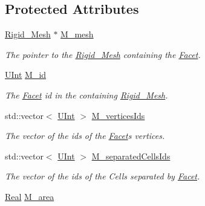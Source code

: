 \subsection*{Protected Attributes}
\begin{DoxyCompactItemize}
\item 
\hyperlink{classFVCode3D_1_1Rigid__Mesh}{Rigid\+\_\+\+Mesh} $\ast$ \hyperlink{classFVCode3D_1_1Rigid__Mesh_1_1Facet_af220d353a3aad7de9b1fa293ac594893}{M\+\_\+mesh}
\begin{DoxyCompactList}\small\item\em The pointer to the \hyperlink{classFVCode3D_1_1Rigid__Mesh}{Rigid\+\_\+\+Mesh} containing the \hyperlink{classFVCode3D_1_1Rigid__Mesh_1_1Facet}{Facet}. \end{DoxyCompactList}\item 
\hyperlink{namespaceFVCode3D_a4bf7e328c75d0fd504050d040ebe9eda}{U\+Int} \hyperlink{classFVCode3D_1_1Rigid__Mesh_1_1Facet_a00456afaee76a9be2a9beb4180a76d15}{M\+\_\+id}
\begin{DoxyCompactList}\small\item\em The \hyperlink{classFVCode3D_1_1Rigid__Mesh_1_1Facet}{Facet} id in the containing \hyperlink{classFVCode3D_1_1Rigid__Mesh}{Rigid\+\_\+\+Mesh}. \end{DoxyCompactList}\item 
std\+::vector$<$ \hyperlink{namespaceFVCode3D_a4bf7e328c75d0fd504050d040ebe9eda}{U\+Int} $>$ \hyperlink{classFVCode3D_1_1Rigid__Mesh_1_1Facet_a4db7298b2b4607ec53de41887df9a025}{M\+\_\+vertices\+Ids}
\begin{DoxyCompactList}\small\item\em The vector of the ids of the \hyperlink{classFVCode3D_1_1Rigid__Mesh_1_1Facet}{Facet}\textquotesingle{}s vertices. \end{DoxyCompactList}\item 
std\+::vector$<$ \hyperlink{namespaceFVCode3D_a4bf7e328c75d0fd504050d040ebe9eda}{U\+Int} $>$ \hyperlink{classFVCode3D_1_1Rigid__Mesh_1_1Facet_ab6e36f3b09142a9cf4955c4be825cf11}{M\+\_\+separated\+Cells\+Ids}
\begin{DoxyCompactList}\small\item\em The vector of the ids of the Cells separated by \hyperlink{classFVCode3D_1_1Rigid__Mesh_1_1Facet}{Facet}. \end{DoxyCompactList}\item 
\hyperlink{namespaceFVCode3D_a40c1f5588a248569d80aa5f867080e83}{Real} \hyperlink{classFVCode3D_1_1Rigid__Mesh_1_1Facet_a084cfcf931748437c2d551a43fdbd47d}{M\+\_\+area}

\end{DoxyCompactItemize}
